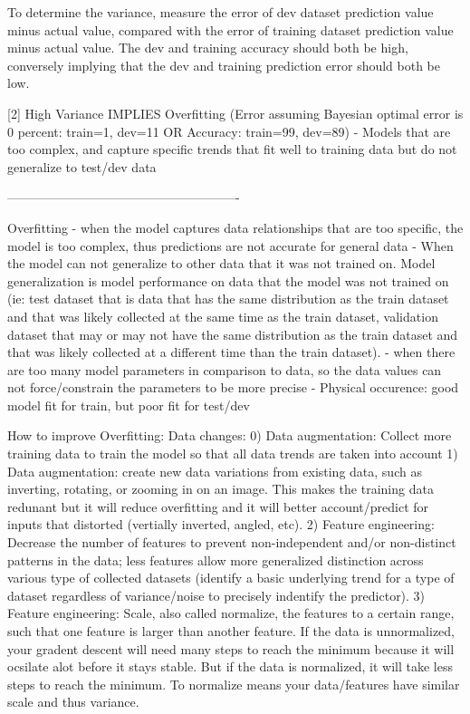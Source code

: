 \documentclass[11pt, onecolumn]{article}
\begin{document}
To determine the variance, measure the error of dev dataset prediction value minus actual value, compared with the error of training dataset prediction value minus actual value. The dev and training accuracy should both be high, conversely implying that the dev and training prediction error should both be low.  

[2] High Variance IMPLIES Overfitting (Error assuming Bayesian optimal error is 0 percent: train=1, dev=11 OR Accuracy: train=99, dev=89)
	- Models that are too complex, and capture specific trends that fit well to training data but do not generalize to test/dev data

-------------------------------------------------------

Overfitting
	- when the model captures data relationships that are too specific, the model is too complex, thus predictions are not accurate for general data
	- When the model can not generalize to other data that it was not trained on. Model generalization is model performance on data that the model was not trained on (ie: test dataset that is data that has the same distribution as the train dataset and that was likely collected at the same time as the train dataset, validation dataset that may or may not have the same distribution as the train dataset and that was likely collected at a different time than the train dataset).
	- when there are too many model parameters in comparison to data, so the data values can not force/constrain the parameters to be more precise
	- Physical occurence: good model fit for train, but poor fit for test/dev

How to improve Overfitting:
Data changes:
0) Data augmentation: Collect more training data to train the model so that all data trends are taken into account
1) Data augmentation: create new data variations from existing data, such as inverting, rotating, or zooming in on an image. This makes the training data redunant but it will reduce overfitting and it will better account/predict for inputs that distorted (vertially inverted, angled, etc).
2) Feature engineering: Decrease the number of features to prevent non-independent and/or non-distinct patterns in the data; less features allow more generalized distinction across various type of collected datasets (identify a basic underlying trend for a type of dataset regardless of variance/noise to precisely indentify the predictor). 
3) Feature engineering: Scale, also called normalize, the features to a certain range, such that one feature is larger than another feature. If the data is unnormalized, your gradent descent will need many steps to reach the minimum because it will ocsilate alot before it stays stable.  But if the data is normalized, it will take less steps to reach the minimum. To normalize means your data/features have similar scale and thus variance.
\end{document}

